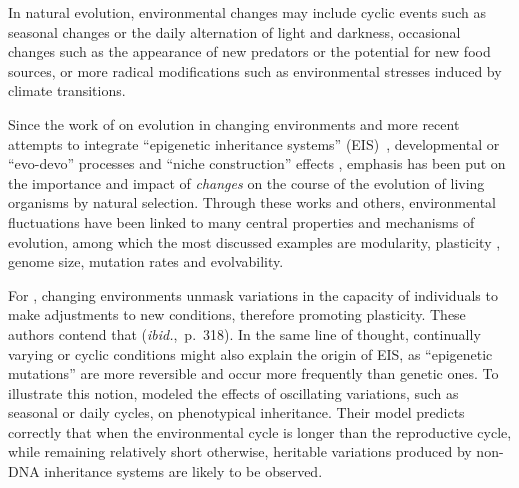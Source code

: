 In natural evolution, environmental changes may include cyclic events such as seasonal changes or the daily alternation of light and darkness, occasional changes such as the appearance of new predators or the potential for new food sources, or more radical modifications such as environmental stresses induced by climate transitions.

Since the work of \citet{levins1968evolution} on evolution in changing environments and more recent attempts to integrate ``epigenetic inheritance systems'' (EIS)~\citep{heard2014transgenerationalepigeneticinheritancemythsandmechanisms}, developmental or ``evo-devo'' processes \citep{muller2007evodevoextendingtheevolutionarysynthesis} and ``niche construction'' effects \citep{laland2016anintroductiontonicheconstructiontheory}, emphasis has been put on the importance and impact of \emph{changes} on the course of the evolution of living organisms by natural selection. Through these works and others, environmental fluctuations have been linked to many central properties and mechanisms of evolution, among which the most discussed examples are modularity, plasticity \citep{west2005developmental}, genome size, mutation rates and evolvability.

For \citet{jablonka2014evolution}, changing environments unmask variations in the capacity of individuals to make adjustments to new conditions, therefore promoting plasticity. These authors contend that  (\emph{ibid.},~p.~318). In the same line of thought, continually varying or cyclic conditions might also explain the origin of EIS, as ``epigenetic mutations'' are more reversible and occur more frequently than genetic ones. To illustrate this notion, \citet{lachmann1996inheritance} modeled the effects of oscillating variations, such as seasonal or daily cycles, on phenotypical inheritance. Their model predicts correctly that when the environmental cycle is longer than the reproductive cycle, while remaining relatively short otherwise, heritable variations produced by non-DNA inheritance systems are likely to be observed. 

